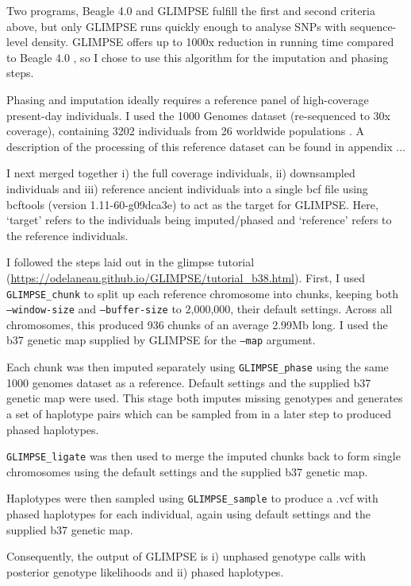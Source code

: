Two programs, Beagle 4.0 \cite{Browning2007} and GLIMPSE \cite{rubinacci2021efficient} fulfill the first and second criteria above, but only GLIMPSE runs quickly enough to analyse SNPs with sequence-level density. GLIMPSE offers up to 1000x reduction in running time compared to Beagle 4.0 \cite{rubinacci2021efficient}, so I chose to use this algorithm for the imputation and phasing steps.   

Phasing and imputation ideally requires a reference panel of high-coverage present-day individuals. I used the 1000 Genomes dataset (re-sequenced to 30x coverage), containing 3202 individuals from 26 worldwide populations \cite{byrska2021high}. A description of the processing of this reference dataset can be found in appendix ...

I next merged together i) the full coverage individuals, ii) downsampled individuals and iii) reference ancient individuals into a single bcf file using bcftools (version 1.11-60-g09dca3e) \cite{li2011statistical} to act as the target for GLIMPSE. Here, `target' refers to the individuals being imputed/phased and `reference' refers to the reference individuals. 

I followed the steps laid out in the glimpse tutorial (\url{https://odelaneau.github.io/GLIMPSE/tutorial_b38.html}). First, I used \texttt{GLIMPSE\_chunk} to split up each reference chromosome into chunks, keeping both \texttt{--window-size} and \texttt{--buffer-size} to 2,000,000, their default settings. Across all chromosomes, this produced 936 chunks of an average 2.99Mb long. I used the b37 genetic map supplied by GLIMPSE for the \texttt{--map} argument. 

Each chunk was then imputed separately using \texttt{GLIMPSE\_phase} using the same 1000 genomes dataset as a reference. Default settings and the supplied b37 genetic map were used. This stage both imputes missing genotypes and generates a set of haplotype pairs which can be sampled from in a later step to produced phased haplotypes.

\texttt{GLIMPSE\_ligate} was then used to merge the imputed chunks back to form single chromosomes using the default settings and the supplied b37 genetic map. 

Haplotypes were then sampled using \texttt{GLIMPSE\_sample} to produce a .vcf with phased haplotypes for each individual, again using default settings and the supplied b37 genetic map. 

Consequently, the output of GLIMPSE is i) unphased genotype calls with posterior genotype likelihoods and ii) phased haplotypes.

